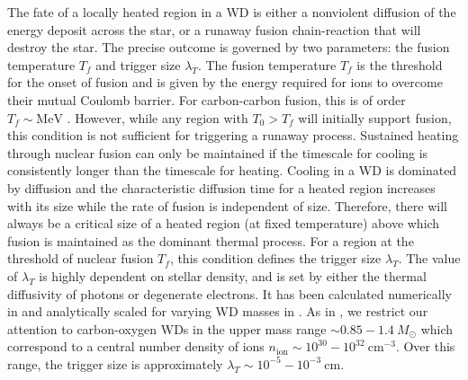 \documentclass[twocolumn,preprintnumbers,amsmath,amssymb,prl, superscriptaddress]{revtex4}
\newcommand{\MeV}{\text{MeV}}
\newcommand{\cm}{\text{cm}}
\begin{document}
The fate of a locally heated region in a WD is either a nonviolent diffusion of the energy deposit across the star, or a runaway fusion chain-reaction that will destroy the star.
The precise outcome is governed by two parameters: the fusion temperature $T_f$ and trigger size $\lambda_T$.
The fusion temperature $T_f$ is the threshold for the onset of fusion and is given by the energy required for ions to overcome their mutual Coulomb barrier.
For carbon-carbon fusion, this is of order $T_f \sim \MeV$ \cite{Gasques:2005ar}. 
However, while any region with $T_0 > T_f$ will initially support fusion, this condition is not sufficient for triggering a runaway process.
Sustained heating through nuclear fusion can only be maintained if the timescale for cooling is consistently longer than the timescale for heating.
Cooling in a WD is dominated by diffusion and the characteristic diffusion time for a heated region increases with its size while the rate of fusion is independent of size.
Therefore, there will always be a critical size of a heated region (at fixed temperature) above which fusion is maintained as the dominant thermal process.
For a region at the threshold of nuclear fusion $T_f$, this condition defines the trigger size $\lambda_T$.
The value of $\lambda_T$ is highly dependent on stellar density, and is set by either the thermal diffusivity of photons or degenerate electrons.
It has been calculated numerically in \cite{Woosley} and analytically scaled for varying WD masses in \cite{Graham:2015apa}.
As in \cite{Graham:2015apa}, we restrict our attention to carbon-oxygen WDs in the upper mass range $\sim 0.85 - 1.4 ~M_{\odot}$ which correspond to a central number density of ions $n_\text{ion} \sim 10^{30} - 10^{32} ~\cm^{-3}$.
Over this range, the trigger size is approximately $\lambda_T \sim 10^{-5} - 10^{-3} ~\text{cm}$.
\end{document}
